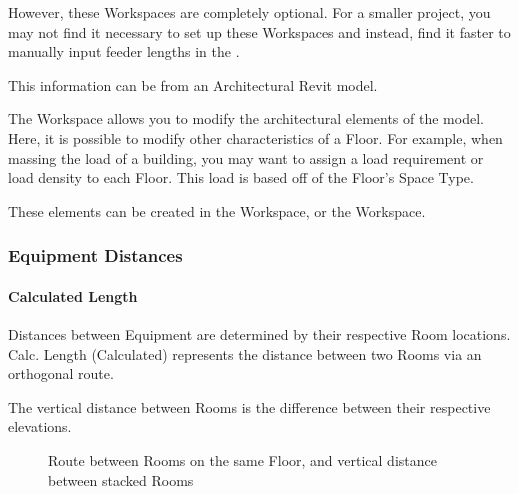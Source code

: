 \documentclass[letterpaper,10pt,english]{sphinxmanual}
\begin{document}
However, these Workspaces are completely optional.  For a smaller project, you may not find it necessary to set up these Workspaces and instead, find it faster to manually input feeder lengths in the {\hyperref[\detokenize{docs/userguide/buildingelectricalmodel/one-line/index-one-line:one-line}]{}}.

This information can be {\hyperref[\detokenize{docs/userguide/index-user_guide:revit-interoperability}]{}} from an Architectural Revit model.

The {\hyperref[\detokenize{docs/userguide/definingarchitecturalelements/archelements/index-arch-elements:arch-elements}]{}} Workspace allows you to modify the architectural elements of the model.  Here, it is possible to modify other characteristics of a Floor.  For example, when massing the load of a building, you may want to assign a load requirement or load density to each Floor.  This load is based off of the Floor’s Space Type.

These elements can be created in the {\hyperref[\detokenize{docs/userguide/definingarchitecturalelements/floorplans/index-floor-plans:floor-plans}]{}} Workspace, or the {\hyperref[\detokenize{docs/userguide/definingarchitecturalelements/archelements/index-arch-elements:arch-elements}]{}} Workspace.


\subsubsection{Equipment Distances}
\label{\detokenize{docs/userguide/index-user_guide:equipment-distances}}

\paragraph{Calculated Length}
\label{\detokenize{docs/userguide/index-user_guide:calculated-length}}\label{\detokenize{docs/userguide/index-user_guide:id4}}
Distances between Equipment are determined by their respective Room locations.  Calc. Length (Calculated) represents the distance between two Rooms via an orthogonal route.

The vertical distance between Rooms is the difference between their respective elevations.

\begin{figure}[H]
\centering
\capstart

\noindent{}
\caption{Route between Rooms on the same Floor, and vertical distance between stacked Rooms}\label{\detokenize{docs/userguide/index-user_guide:id25}}\end{figure}
\end{document}

